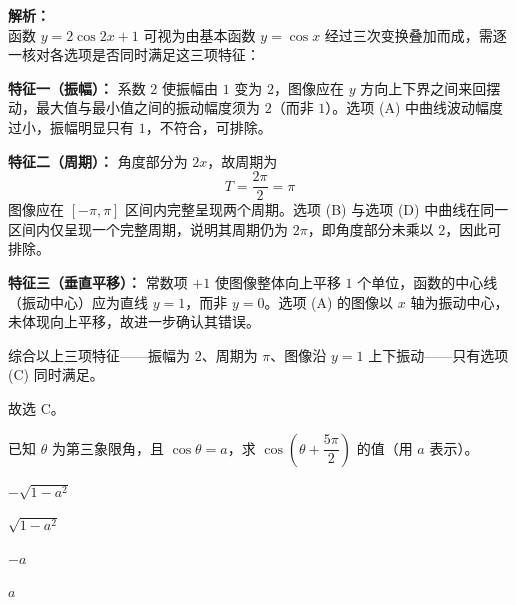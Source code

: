 \documentclass[12pt,a4paper]{exam-zh}
\begin{document}
\begin{solution}
    \textbf{解析：} \\
    函数 $y = 2\cos 2x + 1$ 可视为由基本函数 $y = \cos x$ 经过三次变换叠加而成，需逐一核对各选项是否同时满足这三项特征：

    \textbf{特征一（振幅）：} 系数 $2$ 使振幅由 $1$ 变为 $2$，图像应在 $y$ 方向上下界之间来回摆动，最大值与最小值之间的振动幅度须为 $2$（而非 $1$）。选项 (A) 中曲线波动幅度过小，振幅明显只有 $1$，不符合，可排除。

    \textbf{特征二（周期）：} 角度部分为 $2x$，故周期为
    \[ \displaystyle T = \frac{2\pi}{2} = \pi \]
    图像应在 $[-\pi, \pi]$ 区间内完整呈现两个周期。选项 (B) 与选项 (D) 中曲线在同一区间内仅呈现一个完整周期，说明其周期仍为 $2\pi$，即角度部分未乘以 $2$，因此可排除。

    \textbf{特征三（垂直平移）：} 常数项 $+1$ 使图像整体向上平移 $1$ 个单位，函数的中心线（振动中心）应为直线 $y=1$，而非 $y=0$。选项 (A) 的图像以 $x$ 轴为振动中心，未体现向上平移，故进一步确认其错误。

    综合以上三项特征——振幅为 $2$、周期为 $\pi$、图像沿 $y=1$ 上下振动——只有选项 (C) 同时满足。

    故选 C。
\end{solution}

\begin{question}
    已知 $\theta$ 为第三象限角，且 $\cos\theta = a$，求 $\cos\left(\theta + \dfrac{5\pi}{2}\right)$ 的值（用 $a$ 表示）。\paren[B]
    \begin{choices}
        \item $-\sqrt{1-a^2}$
        \item $\sqrt{1-a^2}$
        \item $-a$
        \item $a$
    \end{choices}
\end{question}
\end{document}
